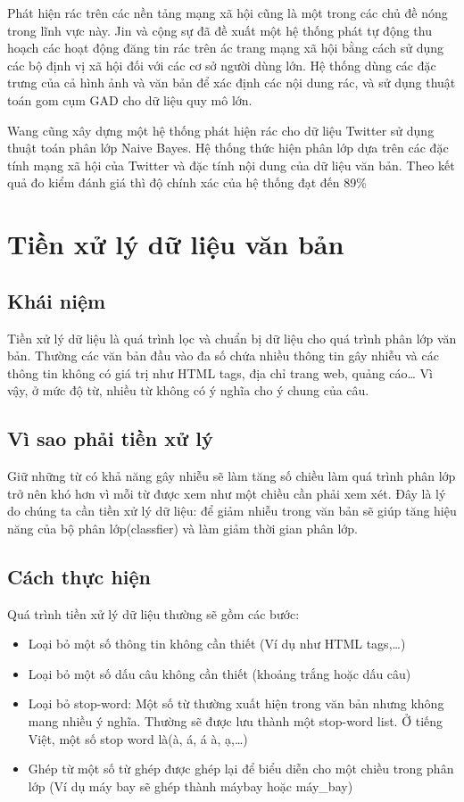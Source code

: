 Phát hiện rác trên các nền tảng mạng xã hội cũng là một trong các chủ đề nóng trong lĩnh vực này. Jin và cộng sự\cite{jin} đã đề xuất một hệ thống phát tự động thu hoạch các hoạt động đăng tin rác trên ác trang mạng xã hội bằng cách sử dụng các bộ định vị xã hội đối với các cơ sở người dùng lớn. Hệ thống dùng các đặc trưng của cả hình ảnh và văn bản để xác định các nội dung rác, và sử dụng thuật toán gom cụm GAD cho dữ liệu quy mô lớn.

Wang cũng xây dựng một hệ thống phát hiện rác cho dữ liệu Twitter sử dụng thuật toán phân lớp Naive Bayes. Hệ thống thức hiện phân lớp dựa trên các đặc tính mạng xã hội của Twitter và đặc tính nội dung của dữ liệu văn bản. Theo kết quả đo kiểm đánh giá thì độ chính xác của hệ thống đạt đến 89\%\cite{5741690}

\section{Tiền xử lý dữ liệu văn bản}
\subsection{Khái niệm}
Tiền xử lý dữ liệu là quá trình lọc và chuẩn bị dữ liệu cho quá trình phân lớp văn bản. Thường các văn bản đầu vào đa số chứa nhiều thông tin gây nhiễu và các thông tin không có giá trị như HTML tags, địa chỉ trang web, quảng cáo… Vì vậy, ở mức độ từ, nhiều từ không có ý nghĩa cho ý chung của câu.
\subsection{Vì sao phải tiền xử lý}
Giữ những từ có khả năng gây nhiễu sẽ làm tăng số chiều làm quá trình phân lớp trở nên khó hơn vì mỗi từ được xem như một chiều cần phải xem xét. Đây là lý do chúng ta cần tiền xử lý dữ liệu: để giảm nhiễu trong văn bản sẽ giúp tăng hiệu năng của bộ phân lớp(classfier) và làm giảm thời gian phân lớp.
\subsection{Cách thực hiện}
Quá trình tiền xử lý dữ liệu thường sẽ gồm các bước:
\begin{itemize}
  \item Loại bỏ một số thông tin không cần thiết (Ví dụ như HTML tags,…)
  \item Loại bỏ một số dấu câu không cần thiết (khoảng trắng hoặc dấu câu)
  \item Loại bỏ stop-word: Một số từ thường xuất hiện trong văn bản nhưng không mang nhiều ý nghĩa. Thường sẽ được lưu thành một stop-word list. Ở tiếng Việt, một số stop word là(à, á, á à, ạ,…)
  \item Ghép từ một số từ ghép được ghép lại để biểu diễn cho một chiều trong phân lớp (Ví dụ máy bay sẽ ghép thành máybay hoặc máy\_bay)
\end{itemize}

